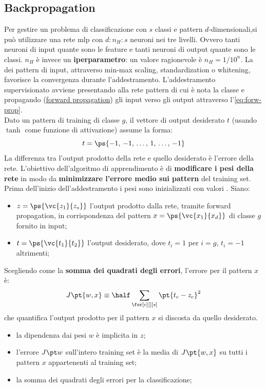 \subsection{Backpropagation}\label{sub:backpropagation} %
Per gestire un problema di classificazione con $s$ classi e pattern $d$-dimensionali,si può utilizzare una rete \ac{mlp} con $d:n_H:s$ neuroni nei tre livelli.
Ovvero tanti neuroni di input quante sono le feature e tanti neuroni di output quante sono le classi.
$n_H$ è invece un \textbf{iperparametro}: un valore ragionevole è $n_H = 1 / 10^n$.
\emptyln{}
La  dei pattern di input, attraverso min-max scaling, standardization o whitening, favorisce la convergenza durante l'addestramento.
L'addestramento supervisionato avviene presentando alla rete pattern di cui è nota la classe e propagando (\hyperref[sub:mlp_forward_propagation]{forward propagation}) gli input verso gli output attraverso l'\cref{eq:forw-prop}.
\\
Dato un pattern di training di classe $g$, il vettore di output desiderato $t$ (usando $\tanh$ come funzione di attivazione) assume la forma:
\[
    t = \ps{-1,\,-1,\,\dots,\,1,\,\dots,\,-1}
\]
La differenza tra l'output prodotto della rete e quello desiderato è l'errore della rete.
L'obiettivo dell'algoritmo di apprendimento è di \textbf{modificare i pesi della rete} in modo da \textbf{minimizzare l'errore medio sui pattern} del training set.
Prima dell'inizio dell'addestramento i pesi sono inizializzati con valori .
\emptyln{}
Siano:
\begin{itemize}
    \item $z = \ps{\vc{z_1}{z_s}}$ l'output prodotto dalla rete, tramite forward propagation, in corrispondenza del pattern $x = \ps{\vc{x_1}{x_d}}$ di classe $g$ fornito in input;
    \item $t = \ps{\vc{t_1}{t_2}}$ l'output desiderato, dove $t_i = 1$ per $i = g$, $t_i = -1$ altrimenti;
\end{itemize}
Scegliendo come  la \textbf{somma dei quadrati degli errori}, l'errore per il pattern $x$ è:
\[
    J\pt{w,x} \equiv \half\sum_{\for[c][][s]}\pt{t_c-z_c}^2
\]
che quantifica l'output prodotto per il pattern $x$ si discosta da quello desiderato.
\begin{note}
    \begin{itemize}
        \item la dipendenza dai pesi $w$ è implicita in $z$;
        \item l'errore $J\pt w$ sull'intero training set è la media di $J\pt{w,x}$ su tutti i pattern $x$ appartenenti al training set;
        \item la somma dei quadrati degli errori  per la classificazione;
    \end{itemize}
\end{note}
